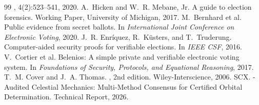 \documentclass[11pt,a4paper]{article}
\theoremstyle{definition}
\begin{document}
\begin{thebibliography}{99}
, 4(2):523--541, 2020.
A.~Hicken and W.~R. Mebane, Jr.
\newblock A guide to election forensics.
\newblock Working Paper, University of Michigan, 2017.
M.~Bernhard et al.
\newblock Public evidence from secret ballots.
\newblock In {\em International Joint Conference on Electronic Voting}, 2020.
J.~R. Enríquez, R.~Küsters, and T.~Truderung.
\newblock Computer-aided security proofs for verifiable elections.
\newblock In {\em IEEE CSF}, 2016.
V.~Cortier et al.
\newblock Belenios: A simple private and verifiable electronic voting system.
\newblock In {\em Foundations of Security, Protocols, and Equational Reasoning}, 2017.
T.~M. Cover and J.~A. Thomas.
, 2nd edition.
\newblock Wiley-Interscience, 2006.
SCX.
-Audited Celestial Mechanics: Multi-Method Consensus for Certified Orbital Determination.
\newblock Technical Report, 2026.
\end{thebibliography}
\end{document}
